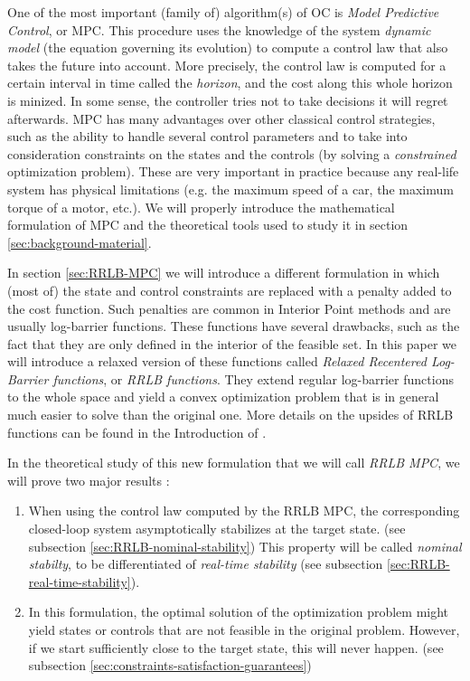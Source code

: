 \documentclass[12pt]{article}
\begin{document}
One of the most important (family of) algorithm(s) of OC is \textit{Model Predictive Control}, or MPC.
This procedure uses the knowledge of the system \textit{dynamic model} (the equation governing its evolution) to compute a control law that also takes the future into account.
More precisely, the control law is computed for a certain interval in time called the \textit{horizon}, and the cost along this whole horizon is minized.
In some sense, the controller tries not to take decisions it will regret afterwards.
MPC has many advantages over other classical control strategies, such as the ability to handle several control parameters and to take into consideration constraints on the states and the controls (by solving a \textit{constrained} optimization problem). These are very important in practice because any real-life system has physical limitations (e.g. the maximum speed of a car, the maximum torque of a motor, etc.).
We will properly introduce the mathematical formulation of MPC and the theoretical tools used to study it in section \ref{sec:background-material}.

In section \ref{sec:RRLB-MPC} we will introduce a different formulation in which (most of) the state and control constraints are replaced with a penalty added to the cost function.
Such penalties are common in Interior Point methods and are usually log-barrier functions.
These functions have several drawbacks, such as the fact that they are only defined in the interior of the feasible set.
In this paper we will introduce a relaxed version of these functions called \textit{Relaxed Recentered Log-Barrier functions}, or \textit{RRLB functions}.
They extend regular log-barrier functions to the whole space and yield a convex optimization problem that is in general much easier to solve than the original one.
More details on the upsides of RRLB functions can be found in the Introduction of \cite{RRLB-linear-MPC}.

In the theoretical study of this new formulation that we will call \textit{RRLB MPC}, we will prove two major results :
\begin{enumerate}
	\item When using the control law computed by the RRLB MPC, the corresponding closed-loop system asymptotically stabilizes at the target state. (see subsection \ref{sec:RRLB-nominal-stability}) This property will be called \textit{nominal stabilty}, to be differentiated of \textit{real-time stability} (see subsection \ref{sec:RRLB-real-time-stability}).
	\item In this formulation, the optimal solution of the optimization problem might yield states or controls that are not feasible in the original problem. However, if we start sufficiently close to the target state, this will never happen. (see subsection \ref{sec:constraints-satisfaction-guarantees})
\end{enumerate}
\end{document}
